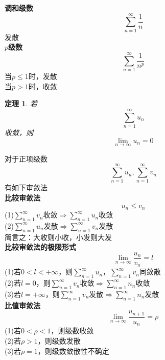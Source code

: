 \documentclass[12pt, a4paper, twoside]{ctexbook}
\newtheorem{theorem}{定理}[section]
\begin{document}
\textbf{调和级数}
$$
\sum_{n=1}^{\infty}\frac{1}{n}
$$
\hspace*{3em}发散\\

\textbf{$p$级数}
$$
\sum_{n=1}^{\infty}\frac{1}{n^p}
$$
\hspace*{3em}当$p\leqslant1$时，发散\\
\hspace*{3em}当$p>1$时，收敛\\

\begin{theorem}
	若
	$$
	\sum_{n=1}^{\infty}u_n
	$$
	收敛，则
	$$
	\lim_{n\to\infty}u_n=0
	$$
\end{theorem}
对于正项级数
$$
\sum_{n=1}^{\infty}u_n,\sum_{n=1}^{\infty}v_n
$$
有如下审敛法\\

\textbf{比较审敛法}
$$u_n\leqslant v_n$$
\hspace*{3em}(1)$\sum\limits_{n=1}^{\infty}v_n$收敛$\Rightarrow\sum\limits_{n=1}^{\infty}u_n$收敛\\
\hspace*{3em}(2)$\sum\limits_{n=1}^{\infty}u_n$发散$\Rightarrow\sum\limits_{n=1}^{\infty}v_n$发散\\
\hspace*{3em}简言之：大收则小收，小发则大发\\

\textbf{比较审敛法的极限形式}
$$
\lim_{n\to\infty}\frac{u_n}{v_n}=l
$$
\hspace*{3em}(1)若$0<l<+\infty$，则$\sum\limits_{n=1}^{\infty}u_n$，$\sum\limits_{n=1}^{\infty}v_n$同敛散\\
\hspace*{3em}(2)若$l=0$，则$\sum\limits_{n=1}^{\infty}v_n$收敛$\Rightarrow\sum\limits_{n=1}^{\infty}n_n$收敛\\
\hspace*{3em}(3)若$l=+\infty$，则$\sum\limits_{n=1}^{\infty}v_n$发散$\Rightarrow\sum\limits_{n=1}^{\infty}n_n$发散\\

\textbf{比值审敛法}
$$
\lim_{n\to \infty}\frac{u_{n+1}}{u_n}=\rho
$$
\hspace*{3em}(1)若$0<\rho<1$，则级数收敛\\
\hspace*{3em}(2)若$\rho>1$，则级数发散\\
\hspace*{3em}(3)若$\rho=1$，则级数敛散性不确定\\
\end{document}
